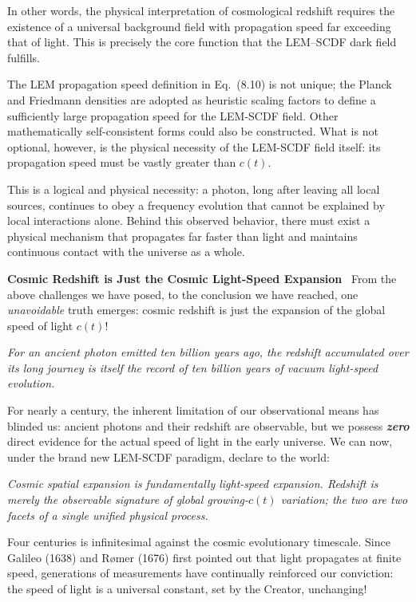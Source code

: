 \documentclass[12pt,leqno]{article}
\begin{document}
{	\medskip
	In other words, the physical interpretation of cosmological redshift requires the existence of a universal background field with propagation speed far exceeding that of light. This is precisely the core function that the LEM--SCDF dark field fulfills. 
	
	\medskip
	The LEM propagation speed definition in Eq.~(8.10) is not unique; the Planck and Friedmann densities are adopted as heuristic scaling factors to define a sufficiently large propagation speed for the LEM-SCDF field. Other mathematically self-consistent forms could also be constructed. What is not optional, however, is the physical necessity of the LEM-SCDF field itself: its propagation speed must be vastly greater than $c(t)$.
	
	\medskip
	This is a logical and physical necessity: a photon, long after leaving all local sources, continues to obey a frequency evolution that cannot be explained by local interactions alone. Behind this observed behavior, there must exist a physical mechanism that propagates far faster than light and maintains continuous contact with the universe as a whole.
	
	
	\medskip
	\bigskip
	\textbf{Cosmic Redshift is Just the Cosmic Light-Speed Expansion}\,\,\,
	From the above challenges we have posed, to the conclusion we have reached, one \emph{unavoidable} truth emerges: cosmic redshift is just the expansion of the global speed of light $c(t)$!
	
	\medskip
	\emph{For an ancient photon emitted ten billion years ago, the redshift accumulated over its long journey is itself the record of ten billion years of vacuum light-speed evolution.}
	
	\medskip
	For nearly a century, the inherent limitation of our observational means has blinded us: ancient photons and their redshift are observable, but we possess \textbf{\textit{zero}} direct evidence for the actual speed of light in the early universe. We can now, under the brand new LEM-SCDF paradigm, declare to the world:
	
	\medskip
	\emph{Cosmic spatial expansion is fundamentally light-speed expansion. Redshift is merely the observable signature of global growing-$c(t)$ variation; the two are two facets of a single unified physical process.}
	
	\medskip
	Four centuries is infinitesimal against the cosmic evolutionary timescale. Since Galileo (1638) and R\o mer (1676) first pointed out that light propagates at finite speed, generations of measurements have continually reinforced our conviction: the speed of light is a universal constant, set by the Creator, unchanging!
	
}
\end{document}
